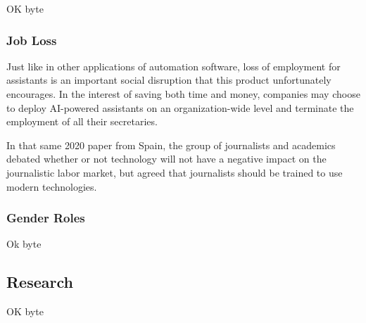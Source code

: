 \documentclass{article}
\begin{document}
OK byte

\subsubsection{Job Loss}

Just like in other applications of automation software, loss of employment for assistants is an important social disruption that this product unfortunately encourages. In the interest of saving both time and money, companies may choose to deploy AI-powered assistants on an organization-wide level and terminate the employment of all their secretaries.

In that same 2020 paper from Spain, the group of journalists and academics debated whether or not technology will not have a negative impact on the journalistic labor market, but agreed that journalists should be trained to use modern technologies.

\subsubsection{Gender Roles}

Ok byte

\subsection{Research}

OK byte
\end{document}
